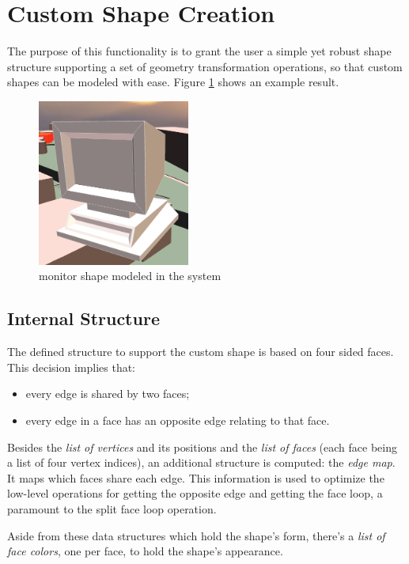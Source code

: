 
\section{Custom Shape Creation}

The purpose of this functionality is to grant the user a simple yet robust shape
structure supporting a set of geometry transformation operations,
so that custom shapes can be modeled with ease. Figure \ref{fig:example} shows an example result.

\begin{figure}[!ht]
	\centering
	\includegraphics[width=5cm]{gfx/ex-monitor.png}
	\caption{monitor shape modeled in the system}
	\label{fig:example}
\end{figure}

\subsection{Internal Structure}

The defined structure to support the custom shape is based on four sided faces.
This decision implies that:
\begin{itemize}
	\item every edge is shared by two faces;
	\item every edge in a face has an opposite edge relating to that face.
\end{itemize}

Besides the \emph{list of vertices} and its positions and the \emph{list of faces}
(each face being a list of four vertex indices),
an additional structure is computed: the \emph{edge map}.
It maps which faces share each edge.
This information is used to optimize the low-level operations for
getting the opposite edge and getting the face loop,
a	paramount to the split face loop operation.

Aside from these data structures which hold the shape's form,
there's a \emph{list of face colors}, one per face, to hold the shape's appearance.

